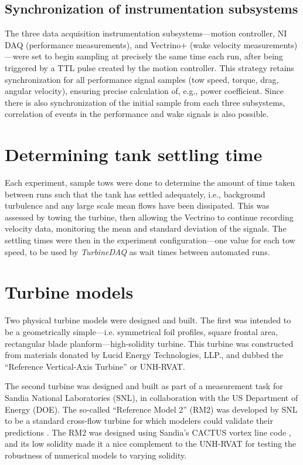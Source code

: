\subsection{Synchronization of instrumentation subsystems}

The three data acquisition instrumentation subsystems---motion controller, NI
DAQ (performance measurements), and Vectrino+ (wake velocity
measurements)---were set to begin sampling at precisely the same time each run,
after being triggered by a TTL pulse created by the motion controller. This
strategy retains synchronization for all performance signal samples (tow speed,
torque, drag, angular velocity), ensuring precise calculation of, e.g., power
coefficient. Since there is also synchronization of the initial sample from each
three subsystems, correlation of events in the performance and wake signals is
also possible.


\section{Determining tank settling time}

Each experiment, sample tows were done to determine the amount of time taken
between runs such that the tank has settled adequately, i.e., background
turbulence and any large scale mean flows have been dissipated. This was
assessed by towing the turbine, then allowing the Vectrino to continue recording
velocity data, monitoring the mean and standard deviation of the signals. The
settling times were then in the experiment configuration---one value for each
tow speed, to be used by \textit{TurbineDAQ} as wait times between automated
runs.


\section{Turbine models}

Two physical turbine models were designed and built. The first was intended to
be a geometrically simple---i.e. symmetrical foil profiles, square frontal area,
rectangular blade planform---high-solidity turbine. This turbine was constructed
from materials donated by Lucid Energy Technologies, LLP., and dubbed the
``Reference Vertical-Axis Turbine'' or UNH-RVAT.

The second turbine was designed and built as part of a measurement task for
Sandia National Laboratories (SNL), in collaboration with the US Department of
Energy (DOE). The so-called ``Reference Model 2'' (RM2) was developed by SNL to
be a standard cross-flow turbine for which modelers could validate their
predictions \cite{Neary2014}. The RM2 was designed using Sandia's CACTUS vortex
line code \cite{Barone2011}, and its low solidity made it a nice complement to
the UNH-RVAT for testing the robustness of numerical models to varying solidity.


